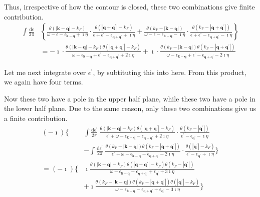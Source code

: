 Thus, irrespective of how the contour is closed, these two combinations give finite contribution.
\[\begin{split} \int \frac{\mathrm{d} \epsilon}{2\pi}
&\left \{ \frac{\theta(|\mathbf{k}-\mathbf{q}|-k_F)}{\omega - \epsilon - \epsilon_{\mathbf{k}-\mathbf{q}} + \imath \eta} \cdot \frac{ \theta(|\mathbf{q}+\mathbf{q}^{'}|-k_F)}{\epsilon + \epsilon^{'} - \epsilon_{\mathbf{q}+\mathbf{q}^{'}} + \imath \eta}
+ \frac{\theta(k_F-|\mathbf{k}-\mathbf{q}|)}{\omega - \epsilon - \epsilon_{\mathbf{k}-\mathbf{q}} - \imath \eta} \cdot \frac{ \theta(k_F-|\mathbf{q}+\mathbf{q}^{'}|)}{\epsilon + \epsilon^{'} - \epsilon_{\mathbf{q}+\mathbf{q}^{'}} - \imath \eta} \right \}\\
& = -\imath \cdot \frac{\theta(|\mathbf{k}-\mathbf{q}|-k_F)\theta(|\mathbf{q}+\mathbf{q}^{'}|-k_F)}{\omega - \epsilon_{\mathbf{k}-\mathbf{q}} + \epsilon^{'} - \epsilon_{\mathbf{q}+\mathbf{q}^{'}} + 2 \imath \eta }
+\imath \cdot \frac{\theta(k_F-|\mathbf{k}-\mathbf{q}|)\theta(k_F-|\mathbf{q}+\mathbf{q}^{'}|)}{\omega - \epsilon_{\mathbf{k}-\mathbf{q}} + \epsilon^{'} - \epsilon_{\mathbf{q}+\mathbf{q}^{'}} - 2 \imath \eta }
\end{split} \]

Let me next integrate over $\epsilon^{'}$, by subtituting this into here. From this product, we again have four terms.

Now these two have a pole in the upper half plane, while these two have a pole in the lower half plane. Due to the same reason, only these two combinations give us a finite contribution.
\[\begin{split}  (-\imath) \{
&\int \frac{\mathrm{d}\epsilon^{'}}{2\pi} \  \frac{\theta(|\mathbf{k}-\mathbf{q}|-k_F)\theta(|\mathbf{q}+\mathbf{q}^{'}|-k_F)}{\epsilon^{'} + \omega - \epsilon_{\mathbf{k}-\mathbf{q}} - \epsilon_{\mathbf{q}+\mathbf{q}^{'}} + 2 \imath \eta }
\cdot \frac{\theta(k_F-|\mathbf{q}^{'}|)}{\epsilon^{'}-\epsilon_{\mathbf{q}^{'}}-\imath \eta} \\
&- \int \frac{\mathrm{d}\epsilon^{'}}{2\pi} \ \frac{\theta(k_F-|\mathbf{k}-\mathbf{q}|)\theta(k_F-|\mathbf{q}+\mathbf{q}^{'}|)}{\epsilon^{'} + \omega - \epsilon_{\mathbf{k}-\mathbf{q}} - \epsilon_{\mathbf{q}+\mathbf{q}^{'}} - 2 \imath \eta }
\cdot \frac{\theta(|\mathbf{q}^{'}|-k_F)}{\epsilon^{'}-\epsilon_{\mathbf{q}^{'}}+\imath \eta} \} \\
=(-\imath) \{
&\imath \frac{\theta(|\mathbf{k}-\mathbf{q}|-k_F)\theta(|\mathbf{q}+\mathbf{q}^{'}|-k_F)\theta(k_F-|\mathbf{q}^{'}|)}{\omega - \epsilon_{\mathbf{k}-\mathbf{q}}-\epsilon_{\mathbf{q}+\mathbf{q}^{'}}+\epsilon_{\mathbf{q}^{'}}+3\imath \eta}\\
&+\imath \frac{\theta(k_F-|\mathbf{k}-\mathbf{q}|)\theta(k_F-|\mathbf{q}+\mathbf{q}^{'}|)\theta(|\mathbf{q}^{'}|-k_F)}{\omega - \epsilon_{\mathbf{k}-\mathbf{q}}-\epsilon_{\mathbf{q}+\mathbf{q}^{'}}+\epsilon_{\mathbf{q}^{'}}-3\imath \eta}
\}
 \end{split}\]

